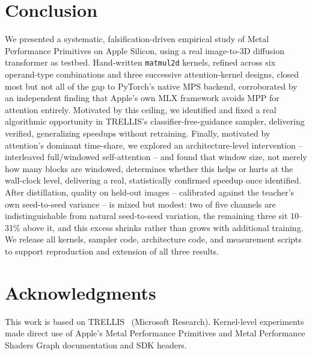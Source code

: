 \documentclass[11pt]{article}
\newcommand{\code}[1]{\texttt{#1}}
\begin{document}
\section{Conclusion}

We presented a systematic, falsification-driven empirical study of Metal Performance Primitives
on Apple Silicon, using a real image-to-3D diffusion transformer as testbed. Hand-written
\code{matmul2d} kernels, refined across six operand-type combinations and three successive
attention-kernel designs, closed most but not all of the gap to PyTorch's native MPS backend,
corroborated by an independent finding that Apple's own MLX framework avoids MPP for attention
entirely. Motivated by this ceiling, we identified and fixed a real algorithmic opportunity in
TRELLIS's classifier-free-guidance sampler, delivering verified, generalizing speedups without
retraining. Finally, motivated by attention's dominant time-share, we explored an
architecture-level intervention -- interleaved full/windowed self-attention -- and found that
window size, not merely how many blocks are windowed, determines whether this helps or hurts at
the wall-clock level, delivering a real, statistically confirmed speedup once identified. After
distillation, quality on held-out images -- calibrated against the teacher's own seed-to-seed
variance -- is mixed but modest: two of five channels are indistinguishable from natural
seed-to-seed variation, the remaining three sit 10--31\% above it, and this excess shrinks rather
than grows with additional training.
We release all kernels, sampler code, architecture code, and
measurement scripts to support reproduction and extension of all three results.

\section*{Acknowledgments}
This work is based on TRELLIS~\cite{trellis2024} (Microsoft Research). Kernel-level experiments
made direct use of Apple's Metal Performance Primitives and Metal Performance Shaders Graph
documentation and SDK headers.
\end{document}
